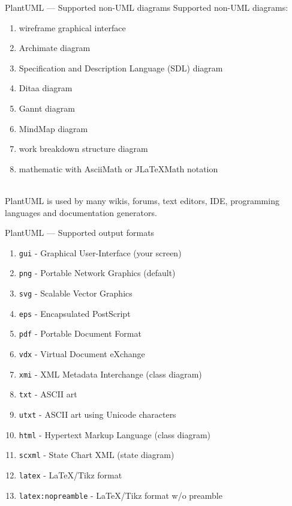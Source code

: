 \documentclass{beamer}
\begin{document}
\begin{frame}{PlantUML — Supported non-UML diagrams}
Supported non-UML diagrams:
\begin{enumerate}
\item wireframe graphical interface
\item Archimate diagram
\item Specification and Description Language (SDL) diagram
\item Ditaa diagram
\item Gannt diagram
\item MindMap diagram
\item work breakdown structure diagram
\item mathematic with AsciiMath or JLaTeXMath notation
\end{enumerate}
\mbox{}\\
PlantUML is used by \alert{many} wikis, forums, text editors, IDE, programming languages and documentation generators.
\end{frame}

\begin{frame}{PlantUML — Supported output formats}
\begin{enumerate}
\item \texttt{gui} - Graphical User-Interface (your screen)
\item \texttt{png} - Portable Network Graphics (default)
\item \texttt{svg} - \alert{Scalable} Vector Graphics
\item \texttt{eps} - Encapsulated PostScript
\item \texttt{pdf} - Portable Document Format
\item \texttt{vdx} - Virtual Document eXchange
\item \texttt{xmi} - XML Metadata Interchange (class diagram)
\item \texttt{txt} - ASCII art
\item \texttt{utxt} - ASCII art using Unicode characters
\item \texttt{html} - Hypertext Markup Language (class diagram)
\item \texttt{scxml} - State Chart XML (state diagram)
\item \texttt{latex} - LaTeX/Tikz format
\item \texttt{latex:nopreamble} - LaTeX/Tikz format w/o preamble
\end{enumerate}
\end{frame}
\end{document}
